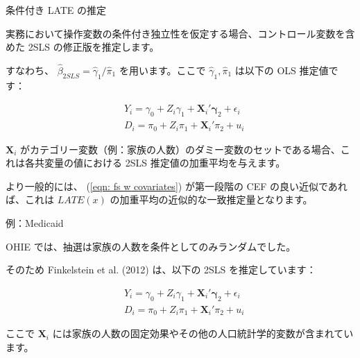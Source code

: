 \documentclass[11pt,handout]{beamer}
\newenvironment{wideitemize}{\itemize\addtolength{\itemsep}{10pt}}{\enditemize}
\begin{document}
\begin{frame}{条件付き LATE の推定}

\begin{wideitemize}
	\item
	実務において操作変数の条件付き独立性を仮定する場合、コントロール変数を含めた 2SLS の修正版を推定します。
	
	\item
	すなわち、 $\hat\beta_{2SLS} = \hat\gamma_1 / \hat\pi_1$ を用います。ここで $\hat\gamma_1, \hat\pi_1$ は以下の OLS 推定値です：
	
		\begin{align}
		&Y_{i} = \gamma_0 +   Z_i \gamma_1 + \bm{X}_i' \bm{\gamma}_2 + \epsilon_{i} \label{eqn: rf w covariates}\\
		&D_i = \pi_0 + Z_i \pi_1 + \bm{X}_i'\pi_2 +  u_i \label{eqn: fs w covariates}
	\end{align}
	
	\pause 
	
	\item
	$\bm{X}_i$ がカテゴリー変数（例：家族の人数）のダミー変数のセットである場合、これは各共変量の値における 2SLS 推定値の加重平均を与えます。
	
	\pause
	\item
	より一般的には、 (\ref{eqn: fs w covariates}) が第一段階の CEF の良い近似であれば、これは $LATE(x)$ の加重平均の近似的な一致推定量となります。
	
\end{wideitemize}

\end{frame}


\begin{frame}{例：Medicaid}
	\begin{wideitemize}
		\item
		OHIE では、抽選は家族の人数を条件としてのみランダムでした。
		
		\pause
		\item
		そのため Finkelstein et al. (2012) は、以下の 2SLS を推定しています：
		
			\begin{align}
			&Y_{i} = \gamma_0 +   Z_i \gamma_1 + \bm{X}_i' \bm{\gamma}_2 + \epsilon_{i} \\
			&D_i = \pi_0 + Z_i \pi_1 + \bm{X}_i'\pi_2 +  u_i 
		\end{align}
		
		\noindent ここで $\bm{X}_i$ には家族の人数の固定効果やその他の人口統計学的変数が含まれています。
					
	\end{wideitemize}
\end{frame}
\end{document}
